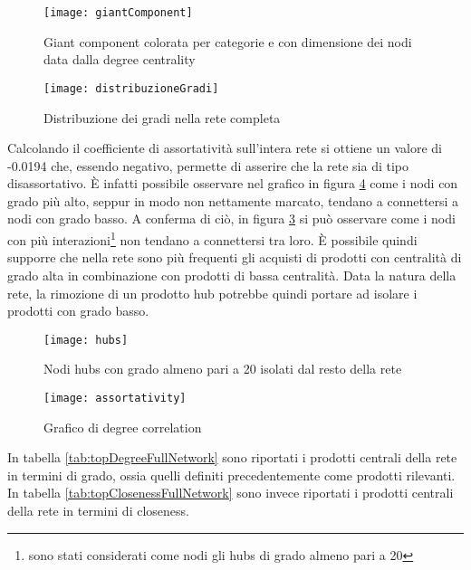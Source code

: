 \begin{figure}[]
    \texttt{[image: giantComponent]}\centering
    \caption{Giant component colorata per categorie e con dimensione dei nodi data dalla degree centrality}\label{fig:giantComponent}
\end{figure}

\begin{figure}[H]
    \texttt{[image: distribuzioneGradi]}\centering
    \caption{Distribuzione dei gradi nella rete completa}\label{fig:distribuzioneGradi}
\end{figure}

Calcolando il coefficiente di assortatività sull'intera rete si ottiene un valore di -0.0194 che, essendo negativo, permette di asserire che la rete sia di tipo disassortativo. È infatti possibile osservare nel grafico in figura \ref{fig:assortativity} come i nodi  con grado più alto, seppur in modo non nettamente marcato, tendano a connettersi a nodi con grado basso. A conferma di ciò, in figura \ref{fig:hubs} si può osservare come i nodi con più interazioni\footnote{sono stati considerati come nodi gli hubs di grado almeno pari a 20} non tendano a connettersi tra loro. È possibile quindi supporre che nella rete sono più frequenti gli acquisti di prodotti con centralità di grado alta in combinazione con prodotti di bassa centralità. Data la natura della rete, la rimozione di un prodotto hub potrebbe quindi portare ad isolare i prodotti con grado basso.

\begin{figure}[H]
    \texttt{[image: hubs]}\centering
    \caption{Nodi hubs con grado almeno pari a 20 isolati dal resto della rete}\label{fig:hubs}
\end{figure}

\begin{figure}[H]
    \texttt{[image: assortativity]}\centering
    \caption{Grafico di degree correlation}\label{fig:assortativity}
\end{figure}

In tabella \ref{tab:topDegreeFullNetwork} sono riportati i prodotti centrali della rete in termini di grado, ossia quelli definiti precedentemente come prodotti rilevanti. \\
In tabella \ref{tab:topClosenessFullNetwork} sono invece riportati i prodotti centrali della rete in termini di closeness. \\

